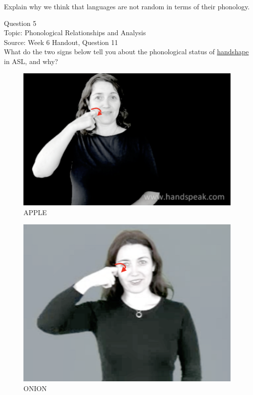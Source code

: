 \documentclass[12pt]{article}
\begin{document}
Explain why we think that languages are not random in terms of their phonology.\\


\newpage

{\large Question 5}\\

Topic: Phonological Relationships and Analysis\\
Source: Week 6 Handout, Question 11\\

What do the two signs below tell you about the phonological status of \underline{handshape} in ASL, and why?\\

\begin{figure}[H]
\includegraphics{../images/asl_apple.png}
\caption{APPLE}
\end{figure}
\begin{figure}[H]
\includegraphics{../images/asl_onion.png}
\caption{ONION}
\end{figure}
\end{document}
